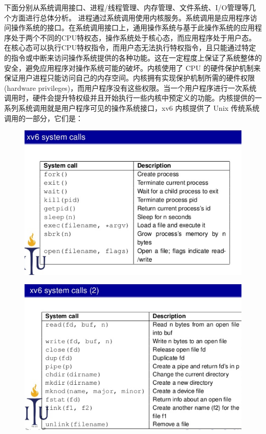 \documentclass[a4paper,12pt]{report}
\begin{document}
下面分别从系统调用接口、进程/线程管理、内存管理、文件系统、I/O管理等几个方面进行总体分析。
	进程通过系统调用使用内核服务。系统调用是应用程序访问操作系统的接口。在系统调用接口上，通用操作系统与基于此操作系统的应用程序处于两个不同的CPU特权态，操作系统处于核心态，而应用程序处于用户态。在核心态可以执行CPU特权指令，而用户态无法执行特权指令，且只能通过特定的指令或中断来访问操作系统提供的各种功能。这在一定程度上保证了系统整体的安全，避免应用程序对操作系统可能的破坏。内核使用了 CPU 的硬件保护机制来保证用户进程只能访问自己的内存空间。内核拥有实现保护机制所需的硬件权限(hardware privileges)，而用户程序没有这些权限。当一个用户程序进行一次系统调用时，硬件会提升特权级并且开始执行一些内核中预定义的功能。内核提供的一系列系统调用就是用户程序可见的操作系统接口，xv6 内核提供了 Unix 传统系统调用的一部分，它们是：
\begin{figure}[H]
	\centering
	\includegraphics [width=1.0\textwidth]{figure//4.2.png}
\end{figure}
\begin{figure}[H]
	\centering
	\includegraphics [width=1.0\textwidth]{figure//4.3.png}
\end{figure}
\end{document}
